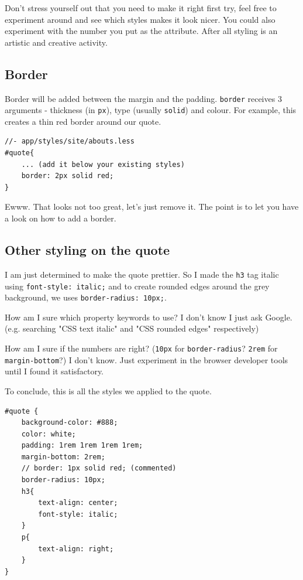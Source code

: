 Don't stress yourself out that you need to make it right first try, feel free to experiment around and see which styles makes it look nicer. You could also experiment with the number you put as the attribute. After all styling is an artistic and creative activity. 

\subsection*{Border}

Border will be added between the margin and the padding. \texttt{border} receives 3 arguments - thickness (in \texttt{px}), type (usually \texttt{solid}) and colour. For example, this creates a thin red border around our quote.

\begin{lstlisting}[language=pug]
//- app/styles/site/abouts.less
#quote{
    ... (add it below your existing styles)
    border: 2px solid red;
}
\end{lstlisting}

Ewww. That looks not too great, let's just remove it. The point is to let you have a look on how to add a border. 

\subsection*{Other styling on the quote}

I am just determined to make the quote prettier. So I made the \texttt{h3} tag italic using \texttt{font-style: italic;} and to create rounded edges around the grey background, we uses \texttt{border-radius: 10px;}. 
\vspace{6mm}

How am I sure which property keywords to use? I don't know I just ask Google. (e.g. searching "CSS text italic" and "CSS rounded edges" respectively)
\vspace{6mm}

How am I sure if the numbers are right? (\texttt{10px} for \texttt{border-radius}? \texttt{2rem} for \texttt{margin-bottom}?) I don't know. Just experiment in the browser developer tools until I found it satisfactory.
\vspace{6mm}

To conclude, this is all the styles we applied to the quote.
\begin{lstlisting}[language=pug]
#quote {
    background-color: #888;
    color: white;
    padding: 1rem 1rem 1rem 1rem;
    margin-bottom: 2rem;
    // border: 1px solid red; (commented)
    border-radius: 10px;
    h3{
        text-align: center;
        font-style: italic;
    }
    p{
        text-align: right;
    }
}
\end{lstlisting}

